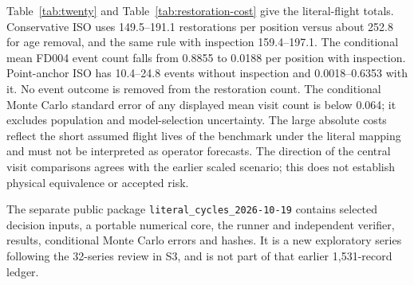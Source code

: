 \documentclass[12pt]{article}
\begin{document}
Table~\ref{tab:twenty} and Table~\ref{tab:restoration-cost} give the literal-flight totals. Conservative ISO uses 149.5--191.1 restorations per position versus about 252.8 for age removal, and the same rule with inspection 159.4--197.1. The conditional mean FD004 event count falls from 0.8855 to 0.0188 per position with inspection. Point-anchor ISO has 10.4--24.8 events without inspection and 0.0018--0.6353 with it. No event outcome is removed from the restoration count. The conditional Monte Carlo standard error of any displayed mean visit count is below 0.064; it excludes population and model-selection uncertainty. The large absolute costs reflect the short assumed flight lives of the benchmark under the literal mapping and must not be interpreted as operator forecasts. The direction of the central visit comparisons agrees with the earlier scaled scenario; this does not establish physical equivalence or accepted risk.

The separate public package \texttt{literal\_cycles\_2026-10-19} contains selected decision inputs, a portable numerical core, the runner and independent verifier, results, conditional Monte Carlo errors and hashes. It is a new exploratory series following the 32-series review in S3, and is not part of that earlier 1,531-record ledger.
\end{document}
